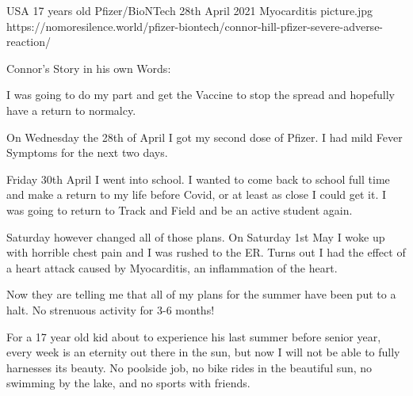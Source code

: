 {USA}
{17 years old}
{Pfizer/BioNTech}
{28th April 2021}
{Myocarditis}
{picture.jpg}
{https://nomoresilence.world/pfizer-biontech/connor-hill-pfizer-severe-adverse-reaction/}
{

Connor’s Story in his own Words:

I was going to do my part and get the Vaccine to stop the spread and hopefully
have a return to normalcy.

On Wednesday the 28th of April I got my second dose of Pfizer. I had mild Fever
Symptoms for the next two days.

Friday 30th April I went into school. I wanted to come back to school full time
and make a return to my life before Covid, or at least as close I could get
it. I was going to return to Track and Field and be an active student again.

Saturday however changed all of those plans. On Saturday 1st May I woke up with
horrible chest pain and I was rushed to the ER. Turns out I had the effect of a
heart attack caused by Myocarditis, an inflammation of the heart.

Now they are telling me that all of my plans for the summer have been put to a
halt. No strenuous activity for 3-6 months!

For a 17 year old kid about to experience his last summer before senior year,
every week is an eternity out there in the sun, but now I will not be able to
fully harnesses its beauty. No poolside job, no bike rides in the beautiful sun,
no swimming by the lake, and no sports with friends.

}

